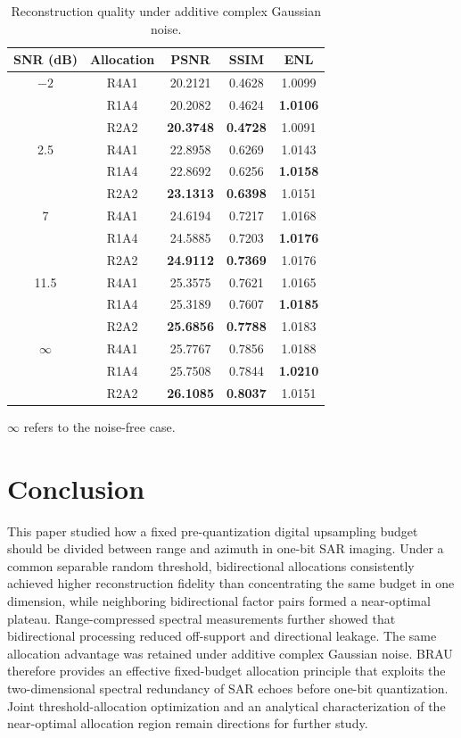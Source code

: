 \documentclass[conference]{IEEEtran}
\begin{document}
\begin{table}[!t]
\caption{Reconstruction quality under additive complex Gaussian noise.}
\label{tab:noise_ablation}
\centering
\scriptsize
\renewcommand{\arraystretch}{0.84}
\setlength{\tabcolsep}{5pt}
\begin{tabular}{c c c c c}
\hline
SNR (dB) & Allocation & PSNR & SSIM & ENL \\
\hline
$-2$ & R4A1 & 20.2121 & 0.4628 & 1.0099 \\
     & R1A4 & 20.2082 & 0.4624 & \textbf{1.0106} \\
     & R2A2 & \textbf{20.3748} & \textbf{0.4728} & 1.0091 \\
\hline
2.5 & R4A1 & 22.8958 & 0.6269 & 1.0143 \\
    & R1A4 & 22.8692 & 0.6256 & \textbf{1.0158} \\
    & R2A2 & \textbf{23.1313} & \textbf{0.6398} & 1.0151 \\
\hline
7 & R4A1 & 24.6194 & 0.7217 & 1.0168 \\
  & R1A4 & 24.5885 & 0.7203 & \textbf{1.0176} \\
  & R2A2 & \textbf{24.9112} & \textbf{0.7369} & 1.0176 \\
\hline
11.5 & R4A1 & 25.3575 & 0.7621 & 1.0165 \\
     & R1A4 & 25.3189 & 0.7607 & \textbf{1.0185} \\
     & R2A2 & \textbf{25.6856} & \textbf{0.7788} & 1.0183 \\
\hline
$\infty$ & R4A1 & 25.7767 & 0.7856 & 1.0188 \\
         & R1A4 & 25.7508 & 0.7844 & \textbf{1.0210} \\
         & R2A2 & \textbf{26.1085} & \textbf{0.8037} & 1.0151 \\
\hline
\end{tabular}

\vspace{2pt}
\parbox{0.96\linewidth}{\footnotesize  $\infty$ refers to the noise-free case.}
\end{table}

\section{Conclusion}

This paper studied how a fixed pre-quantization digital upsampling budget should be divided between range and azimuth in one-bit SAR imaging. Under a common separable random threshold, bidirectional allocations consistently achieved higher reconstruction fidelity than concentrating the same budget in one dimension, while neighboring bidirectional factor pairs formed a near-optimal plateau. Range-compressed spectral measurements further showed that bidirectional processing reduced off-support and directional leakage. The same allocation advantage was retained under additive complex Gaussian noise. BRAU therefore provides an effective fixed-budget allocation principle that exploits the two-dimensional spectral redundancy of SAR echoes before one-bit quantization. Joint threshold-allocation optimization and an analytical characterization of the near-optimal allocation region remain directions for further study.
\end{document}
